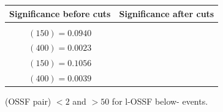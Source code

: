 \documentclass[letterpaper,12pt]{article}
\begin{document}
\begin{figure}[h]
  \vspace{0.6cm}
  \tiny
  \setlength{\tabcolsep}{20pt}
  \renewcommand{\arraystretch}{1.6}
  \begin{tabular}{|c|c|}
    \hline
    Significance before cuts & Significance after cuts\\
    \hline
    \Gape[0.2cm]{\makecell{
        \sig{} $(100) = 0.1192$\\
        \sig{} $(150) = 0.0940$\\
        \sig{} $(400) = 0.0023$ }} & 
    \makecell{
      \sig{} $(100) = 0.1446$\\
      \sig{} $(150) = 0.1056$\\
      \sig{} $(400) = 0.0039$}\\
    \hline
  \end{tabular}
  \caption{\DeltaR{} (OSSF pair) $<2$ and \ptmiss{} $>50$ for \3l-OSSF below-\Zboson{} events.}
  \label{fig:3lc1}
\end{figure}
\end{document}
